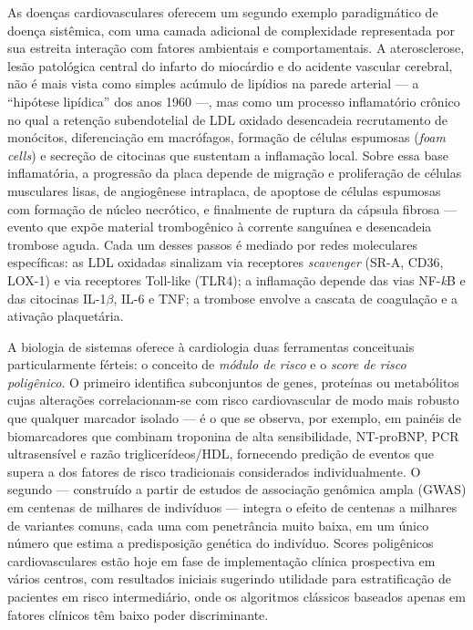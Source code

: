 As doenças cardiovasculares oferecem um segundo exemplo paradigmático de doença sistêmica, com uma camada adicional de complexidade representada por sua estreita interação com fatores ambientais e comportamentais. A aterosclerose, lesão patológica central do infarto do miocárdio e do acidente vascular cerebral, não é mais vista como simples acúmulo de lipídios na parede arterial --- a ``hipótese lipídica'' dos anos 1960 ---, mas como um processo inflamatório crônico no qual a retenção subendotelial de LDL oxidado desencadeia recrutamento de monócitos, diferenciação em macrófagos, formação de células espumosas (\emph{foam cells}) e secreção de citocinas que sustentam a inflamação local. Sobre essa base inflamatória, a progressão da placa depende de migração e proliferação de células musculares lisas, de angiogênese intraplaca, de apoptose de células espumosas com formação de núcleo necrótico, e finalmente de ruptura da cápsula fibrosa --- evento que expõe material trombogênico à corrente sanguínea e desencadeia trombose aguda. Cada um desses passos é mediado por redes moleculares específicas: as LDL oxidadas sinalizam via receptores \emph{scavenger} (SR-A, CD36, LOX-1) e via receptores Toll-like (TLR4); a inflamação depende das vias NF-\emph{k}B e das citocinas IL-1$\beta$, IL-6 e TNF; a trombose envolve a cascata de coagulação e a ativação plaquetária.

A biologia de sistemas oferece à cardiologia duas ferramentas conceituais particularmente férteis: o conceito de \emph{módulo de risco} e o \emph{score de risco poligênico}. O primeiro identifica subconjuntos de genes, proteínas ou metabólitos cujas alterações correlacionam-se com risco cardiovascular de modo mais robusto que qualquer marcador isolado --- é o que se observa, por exemplo, em painéis de biomarcadores que combinam troponina de alta sensibilidade, NT-proBNP, PCR ultrasensível e razão triglicerídeos/HDL, fornecendo predição de eventos que supera a dos fatores de risco tradicionais considerados individualmente. O segundo --- construído a partir de estudos de associação genômica ampla (GWAS) em centenas de milhares de indivíduos --- integra o efeito de centenas a milhares de variantes comuns, cada uma com penetrância muito baixa, em um único número que estima a predisposição genética do indivíduo. Scores poligênicos cardiovasculares estão hoje em fase de implementação clínica prospectiva em vários centros, com resultados iniciais sugerindo utilidade para estratificação de pacientes em risco intermediário, onde os algoritmos clássicos baseados apenas em fatores clínicos têm baixo poder discriminante.


